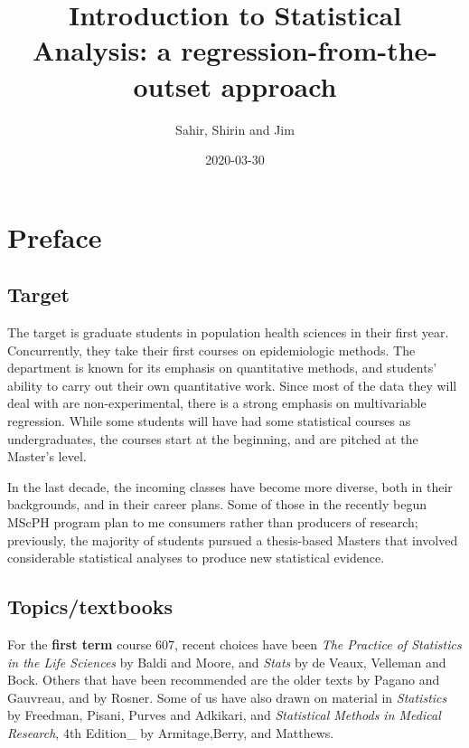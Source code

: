\documentclass[]{book}
\title{Introduction to Statistical Analysis: a regression-from-the-outset approach}
\author{Sahir, Shirin and Jim}
\date{2020-03-30}
\begin{document}
\maketitle

{
\setcounter{tocdepth}{1}
\tableofcontents
}
\hypertarget{preface}{%
\chapter*{Preface}\label{preface}}

\hypertarget{target}{%
\section{Target}\label{target}}

The target is graduate students in population health sciences in their first year. Concurrently, they take their first courses on epidemiologic methods. The department is known for its emphasis on quantitative methods, and students' ability to carry out their own quantitative work. Since most of the data they will deal with are non-experimental, there is a strong emphasis on multivariable regression. While some students will have had some statistical courses as undergraduates, the courses start at the beginning, and are pitched at the Master's level.

In the last decade, the incoming classes have become more diverse, both in their backgrounds, and in their career plans. Some of those in the recently begun MScPH program plan to me consumers rather than producers of research; previously, the majority of students pursued a thesis-based Masters that involved considerable statistical analyses to produce new statistical evidence.

\hypertarget{topicstextbooks}{%
\section{Topics/textbooks}\label{topicstextbooks}}

For the \textbf{first term} course 607, recent choices have been \emph{The Practice of Statistics in the Life Sciences} by Baldi and Moore, and \emph{Stats} by de Veaux, Velleman and Bock. Others that have been recommended are the older texts by Pagano and Gauvreau, and by Rosner. Some of us have also drawn on material in \emph{Statistics} by Freedman, Pisani, Purves and Adkikari, and
\emph{Statistical Methods in Medical Research}, 4th Edition\_ by
Armitage,Berry, and Matthews.
\end{document}
